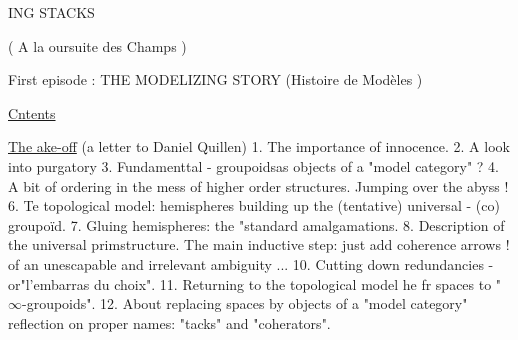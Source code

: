 ING STACKS

( A la oursuite des Champs )

First episode : THE MODELIZING STORY
(Histoire de Modèles )

\uline{Cntents} \hand{,}

 \uline{The ake-off} (a letter to Daniel Quillen)
1. The importance of innocence.
2. A  look into purgatory
3. Fundamenttal \hand{$\infty$}- groupoidsas objects of a "model category" ?
4. A bit of ordering in the mess of higher order structures.
 Jumping over the abyss !
6. Te topological model: hemispheres building up the (tentative)
universal \hand{$\infty$}- (co) groupoïd.
7. Gluing hemispheres: the "standard amalgamations.
8. Description of the universal prim\hand{/}structure.
 The main inductive step: just add coherence arrows !    
  of an \hand{(}unescapable and irrelevant\hand{)} ambiguity ...
10. Cutting down redundancies - or\hand{:}"l'embarras du choix".
11. Returning to the topological model \hand{(} he  
 fr spaces to "$\infty$-groupoids"\hand{)}.
12. About replacing spaces by objects of a "model category" 
   reflection on proper names: "tacks" and "coherators".
